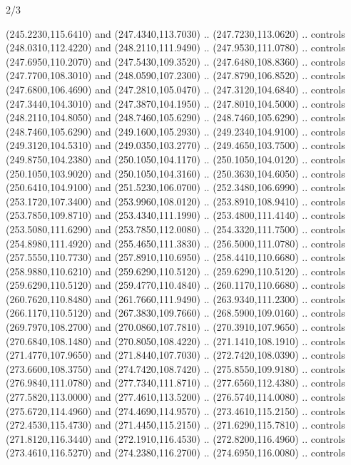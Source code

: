 \begin{flagdescription}{2/3}
\begin{scope}[xshift=0.5\flaglength,yshift=0.5\flagwidth,scale=\flagwidth/259.2]
\begin{scope}[y=0.8pt, x=0.8pt, yscale=-1,shift={(-243,-162)}]
      (245.2230,115.6410) and (247.4340,113.7030) .. (247.7230,113.0620) .. controls
      (248.0310,112.4220) and (248.2110,111.9490) .. (247.9530,111.0780) .. controls
      (247.6950,110.2070) and (247.5430,109.3520) .. (247.6480,108.8360) .. controls
      (247.7700,108.3010) and (248.0590,107.2300) .. (247.8790,106.8520) .. controls
      (247.6800,106.4690) and (247.2810,105.0470) .. (247.3120,104.6840) .. controls
      (247.3440,104.3010) and (247.3870,104.1950) .. (247.8010,104.5000) .. controls
      (248.2110,104.8050) and (248.7460,105.6290) .. (248.7460,105.6290) .. controls
      (248.7460,105.6290) and (249.1600,105.2930) .. (249.2340,104.9100) .. controls
      (249.3120,104.5310) and (249.0350,103.2770) .. (249.4650,103.7500) .. controls
      (249.8750,104.2380) and (250.1050,104.1170) .. (250.1050,104.0120) .. controls
      (250.1050,103.9020) and (250.1050,104.3160) .. (250.3630,104.6050) .. controls
      (250.6410,104.9100) and (251.5230,106.0700) .. (252.3480,106.6990) .. controls
      (253.1720,107.3400) and (253.9960,108.0120) .. (253.8910,108.9410) .. controls
      (253.7850,109.8710) and (253.4340,111.1990) .. (253.4800,111.4140) .. controls
      (253.5080,111.6290) and (253.7850,112.0080) .. (254.3320,111.7500) .. controls
      (254.8980,111.4920) and (255.4650,111.3830) .. (256.5000,111.0780) .. controls
      (257.5550,110.7730) and (257.8910,110.6950) .. (258.4410,110.6680) .. controls
      (258.9880,110.6210) and (259.6290,110.5120) .. (259.6290,110.5120) .. controls
      (259.6290,110.5120) and (259.4770,110.4840) .. (260.1170,110.6680) .. controls
      (260.7620,110.8480) and (261.7660,111.9490) .. (263.9340,111.2300) .. controls
      (266.1170,110.5120) and (267.3830,109.7660) .. (268.5900,109.0160) .. controls
      (269.7970,108.2700) and (270.0860,107.7810) .. (270.3910,107.9650) .. controls
      (270.6840,108.1480) and (270.8050,108.4220) .. (271.1410,108.1910) .. controls
      (271.4770,107.9650) and (271.8440,107.7030) .. (272.7420,108.0390) .. controls
      (273.6600,108.3750) and (274.7420,108.7420) .. (275.8550,109.9180) .. controls
      (276.9840,111.0780) and (277.7340,111.8710) .. (277.6560,112.4380) .. controls
      (277.5820,113.0000) and (277.4610,113.5200) .. (276.5740,114.0080) .. controls
      (275.6720,114.4960) and (274.4690,114.9570) .. (273.4610,115.2150) .. controls
      (272.4530,115.4730) and (271.4450,115.2150) .. (271.6290,115.7810) .. controls
      (271.8120,116.3440) and (272.1910,116.4530) .. (272.8200,116.4960) .. controls
      (273.4610,116.5270) and (274.2380,116.2700) .. (274.6950,116.0080) .. controls

\end{scope}
\end{scope}
\end{flagdescription}
